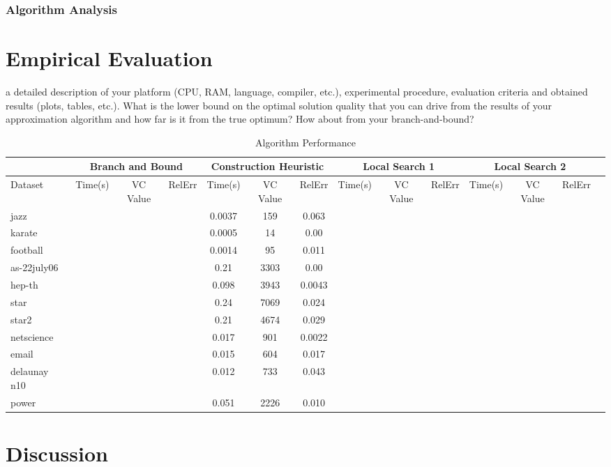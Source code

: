 \documentclass[acmlarge]{acmart}
\begin{document}
\subsubsection{Algorithm Analysis}

\lipsum[1]

\section{Empirical Evaluation}

a detailed description of your platform (CPU, RAM, language, compiler, etc.),
experimental procedure, evaluation criteria and obtained results (plots, tables, etc.). What is the
lower bound on the optimal solution quality that you can drive from the results of your approximation
algorithm and how far is it from the true optimum? How about from your branch-and-bound?

\begin{table}[H]
	\caption{Algorithm Performance}
	\label{tab:freq}
	\begin{tabular}{|l|c|c|c|c|c|c|c|c|c|c|c|c|c|}
		\toprule
		&\multicolumn{3}{c|}{Branch and Bound}&\multicolumn{3}{c|}{Construction Heuristic}&\multicolumn{3}{c|}{Local Search 1}&\multicolumn{3}{c|}{Local Search 2}\\
		\midrule
		Dataset&Time(s)&VC Value&RelErr&Time(s)&VC Value&RelErr&Time(s)&VC Value&RelErr&Time(s)&VC Value&RelErr&\\
		\midrule
		jazz&&&&0.0037&159&0.063&&&&&&\\
		karate&&&&0.0005&14&0.00&&&&&&\\
		football&&&&0.0014&95&0.011&&&&&&\\
		as-22july06&&&&0.21&3303&0.00&&&&&&\\
		hep-th&&&&0.098&3943&0.0043&&&&&&\\
		star&&&&0.24&7069&0.024&&&&&&\\
		star2&&&&0.21&4674&0.029&&&&&&\\
		netscience&&&&0.017&901&0.0022&&&&&&\\
		email&&&&0.015&604&0.017&&&&&&\\
		delaunay n10&&&&0.012&733&0.043&&&&&&\\
		power&&&&0.051&2226&0.010&&&&&&\\
		\bottomrule
	\end{tabular}
\label{table:alg_perf}
\end{table}


\section{Discussion}
\end{document}
